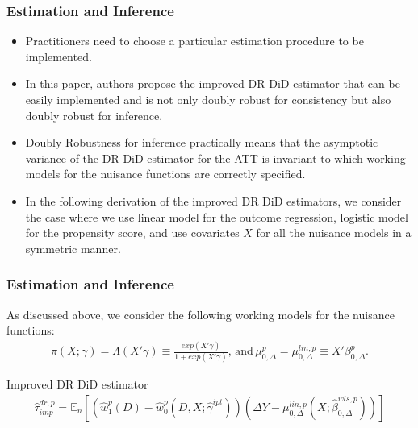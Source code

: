 \documentclass{beamer}
\begin{document}
\begin{frame}\frametitle{Estimation and Inference}
\begin{itemize}
    \item Practitioners need to choose a particular estimation procedure to be implemented.
    \item In this paper, authors propose the improved DR DiD estimator that can be easily implemented and is not only doubly robust for consistency but also doubly robust for inference.
    \item  Doubly Robustness for inference practically means that the asymptotic variance of the DR DiD estimator for the ATT is invariant to which working models for the nuisance functions are correctly specified.
    \item In the following derivation of the improved DR DiD estimators, we consider the case where we use linear model for the outcome regression, logistic model for the propensity score, and use covariates $X$ for all the nuisance models in a symmetric manner.
\end{itemize}
\end{frame}

\begin{frame}\frametitle{Estimation and Inference}
    As discussed above, we consider the following working models for the nuisance functions:
    \begin{align*}
        \pi(X;\gamma) = \Lambda(X'\gamma) \equiv \frac{exp(X'\gamma)}{1 + exp(X'\gamma)},\,\text{and} \, \mu^{p}_{0, \Delta} = \mu^{lin, p}_{0, \Delta} \equiv X'\beta^{p}_{0,\Delta}.
    \end{align*}
    \begin{block}{Improved DR DiD estimator}
        \begin{align*}
        \widehat{\tau}^{dr,p}_{imp} = \mathbb{E}_{n}[(\widehat{w}^{p}_{1}(D) - \widehat{w}^{p}_{0}(D,X;\widehat{\gamma}^{ipt}))(\Delta Y - \mu^{lin, p}_{0, \Delta}(X;\widehat{\beta}^{wls, p}_{0, \Delta}))]
        \end{align*}
    \end{block}
\end{frame}
\end{document}
